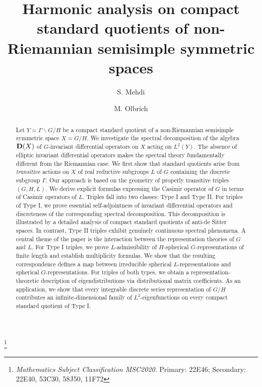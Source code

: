 \documentclass[10]{amsart}
\theoremstyle{remark}
\theoremstyle{definition}
\numberwithin{equation}{section}
\begin{document}
\baselineskip=18pt
\sloppy
\title[Harmonic analysis on standard quotients]
{Harmonic analysis on compact standard quotients of non-Riemannian semisimple symmetric spaces}
\author{S. Mehdi}
\author{M. Olbrich}
\thanks{{\em Mathematics Subject Classification MSC2020}. Primary: 22E46; Secondary: 22E40, 53C30, 58J50, 11F72}
\address{Université de Lorraine, CNRS, IECL, F-57000 Metz, France}
\address{Facult\'e des Sciences, de la Technologie et de la Communication , Universit\'e du Luxembourg, Luxembourg}
\maketitle

\begin{abstract}
Let $Y=\Gamma\backslash G/H$ be a compact standard quotient of a non-Riemannian semisimple symmetric space $X=G/H$. We investigate the spectral decomposition of the algebra ${\bf D}(X)$ of $G$-invariant differential operators on $X$ acting on $L^2(Y)$. The absence of elliptic invariant differential operators makes the spectral theory fundamentally different from the Riemannian case. We first show that standard quotients arise from {\it transitive} actions on $X$ of real reductive subgroups $L$ of $G$ containing the discrete subgroup $\Gamma$. Our approach is based on the geometry of properly transitive triples $(G,H,L)$. We derive explicit formulas expressing the Casimir operator of $G$ in terms of Casimir operators of $L$. Triples fall into two classes: Type I and Type II. For triples of Type I, we prove essential self-adjointness of invariant differential operators and discreteness of the corresponding spectral decomposition. This decomposition is illustrated by a detailed analysis of compact standard quotients of anti-de Sitter spaces. In contrast, Type II triples exhibit genuinely continuous spectral phenomena. A central theme of the paper is the interaction between the representation theories of $G$ and $L$. For Type I triples, we prove $L$-admissibility of $H$-spherical $G$-representations of finite length and establish multiplicity formulas. We show that the resulting correspondence defines a map between irreducible spherical $L$-representations and spherical $G$-representations. For triples of both types, we obtain a representation-theoretic description of eigendistributions via distributional matrix coefficients. As an application, we show that every integrable discrete series representation of $G/H$ contributes an infinite-dimensional family of $L^2$-eigenfunctions on every compact standard quotient of Type I.
\end{abstract}
\end{document}
